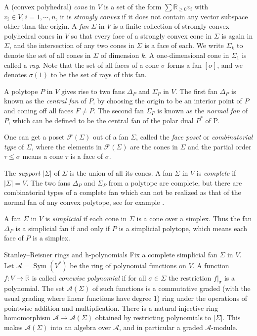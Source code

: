 \documentclass{amsart}
\makeatletter
\def\subsection{\@startsection{subsection}{2}
  \z@{.5\linespacing\@plus.7\linespacing}{.5\linespacing}
  {\normalfont\bfseries}}
\theoremstyle{definition}
\theoremstyle{remark}
\numberwithin{equation}{section}
\makeatother
\begin{document}
A (convex polyhedral) \emph{cone} in $V$ is a set of the form $\sum \mathbb{R}_{\geq 0} v_i$ with $v_i \in V, i=1, \cdots, n$, it is \emph{strongly convex} if it does not contain any vector subspace other than the origin. A \emph{fan} $\Sigma$ in $V$ is a finite collection of strongly convex polyhedral cones in $V$ so that every face of a strongly convex cone
in $\Sigma$ is again in $\Sigma$, and the intersection of any two cones in $\Sigma$ is a face of each. We write $\Sigma_k$ to denote the set of all cones in $\Sigma$ of dimension $k$. A one-dimensional cone in $\Sigma_1$ is called a \emph{ray}. Note that the set of all faces of a cone $\sigma$ forms a fan $[\sigma]$, and we denotes $\sigma(1)$ to be the set of rays of this fan.

A polytope $P$ in $V$ gives rise to two fans $\Delta_P$ and $\Sigma_P$ in $V$. The first fan $\Delta_P$ is known as the \emph{central fan} of $P$, by choosing the origin to be an interior point of $P$ and coning off all faces $F \neq P$. The second fan $\Sigma_P$ is known as the \emph{normal fan} of $P$, which can be defined to be the central fan of the polar dual $P^*$ of P. 

One can get a poset $\mathcal{F}(\Sigma)$ out of a fan $\Sigma$, called the \emph{face poset} or \emph{combinatorial type} of $\Sigma$, where the elements in $\mathcal{F}(\Sigma)$ are the cones in $\Sigma$ and the partial order $\tau \leq \sigma$ means a cone $\tau$ is a face of $\sigma$. 

The \emph{support} $|\Sigma|$ of $\Sigma$ is the union of all its cones. A fan $\Sigma$ in $V$ is \emph{complete} if $|\Sigma|=V$. The two fans $\Delta_P$ and $\Sigma_P$ from a polytope are complete, but there are combinatorial types of a complete fan which can not be realized as that of the normal fan of any convex polytope, see for example \cite[Example 5.10]{ziegler2012lectures}. 

A fan $\Sigma$ in $V$ is \emph{simplicial} if each cone in $\Sigma$ is a cone over a
simplex. Thus the fan $\Delta_P$ is a simplicial fan if and only if $P$ is a simplicial polytope, which means each face of $P$ is a simplex. 

\subsection{Stanley--Reisner rings and h-polynomials} \label{sec-SR}
Fix a complete simplicial fan $\Sigma$ in $V$. Let $\mathcal{A}=\operatorname{Sym}\left(V^*\right)$ be the ring of polynomial functions on $V$. 
A function $f:V \rightarrow \mathbb{R}$ is called \emph{conewise polynomial} if for all $\sigma \in \Sigma$ the restriction $\left.f\right|_\sigma$ is a polynomial. The set $\mathcal{A}(\Sigma)$ of such functions is a commutative graded (with the usual grading where linear functions have degree 1) ring under the operations of pointwise addition and multiplication. There is a natural injective ring homomorphism $\mathcal{A} \rightarrow \mathcal{A}(\Sigma)$ obtained by restricting polynomials to $|\Sigma|$. This makes $\mathcal{A}(\Sigma)$ into an algebra over $\mathcal{A}$, and in particular a graded $\mathcal{A}$-module.
\end{document}
